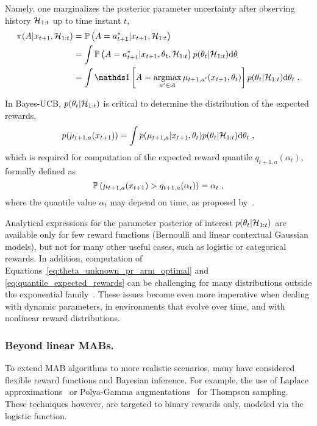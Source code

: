 Namely,
one marginalizes the posterior parameter uncertainty after observing  history $\mathcal{H}_{1:t}$ up to time instant $t$, \ie
\begin{equation}
\begin{split}
\pi(A|x_{t+1},\HH_{1:t})&=\Prob{A=a_{t+1}^*|x_{t+1},\HH_{1:t}} \\
&= \int \Prob{A=a_{t+1}^*|x_{t+1},\theta_t,\HH_{1:t}} p(\theta_t|\HH_{1:t}) \dd{\theta} \\
&=\int \myind{A=\argmax_{a^\prime \in \A} \mu_{t+1,a^\prime}(x_{t+1},\theta_t)} p(\theta_t|\HH_{1:t}) \dd{\theta_t} \; .
\end{split}
\label{eq:theta_unknown_pr_arm_optimal}
\end{equation}

In Bayes-UCB,
$p(\theta_t|\mathcal{H}_{1:t})$ is critical to determine the distribution of the expected rewards, \ie
\begin{equation}
p(\mu_{t+1,a}(x_{t+1})) = \int p(\mu_{t+1,a}|x_{t+1},\theta_{t}) p(\theta_t|\mathcal{H}_{1:t}) \mathrm{d} \theta_t \;,
\label{eq:density_expected_rewards}
\end{equation}
which is required for computation of the expected reward quantile $q_{t+1,a}(\alpha_{t})$, formally defined as
\begin{equation}
\mathbb{P}\left( \mu_{t+1,a}(x_{t+1})>q_{t+1,a}(\alpha_{t}) \right)=\alpha_{t} \;,
\label{eq:quantile_expected_rewards}
\end{equation}
where the quantile value $\alpha_t$ may depend on time, as proposed by~\citet{ip-Kaufmann2012}.

Analytical expressions for the parameter posterior of interest $p(\theta_t|\mathcal{H}_{1:t})$ are available only for few reward functions (\eg Bernoulli and linear contextual Gaussian models),
but not for many other useful cases, such as logistic or categorical rewards.
In addition,
computation of Equations~\eqref{eq:theta_unknown_pr_arm_optimal} and \eqref{eq:quantile_expected_rewards} can be challenging for many distributions outside the exponential family~\citep{ic-Korda2013}.
These issues become even more imperative
when dealing with dynamic parameters, \ie in environments that evolve over time,
and with nonlinear reward distributions.

\subsubsection{Beyond linear MABs.}
\label{sssec:mab_algos_complex}
To extend MAB algorithms to more realistic scenarios,
many have considered flexible reward functions and Bayesian inference.
For example,
the use of Laplace approximations~\citep{ic-Chapelle2011} 
or Polya-Gamma augmentations~\citep{ic-Dumitrascu2018}
for Thompson sampling.
These techniques however, are targeted to binary rewards only, modeled via the logistic function.

